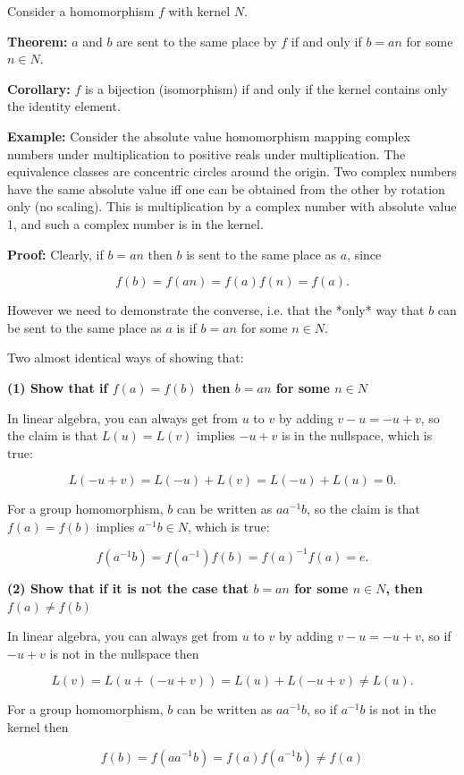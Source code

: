 Consider a homomorphism $f$ with kernel $N$.

\textbf{Theorem:} $a$ and $b$ are sent to the same place by $f$ if and only if
$b = an$ for some $n \in N$.

\textbf{Corollary:} $f$ is a bijection (isomorphism) if and only if the kernel
contains only the identity element.

\textbf{Example:} Consider the absolute value homomorphism mapping complex numbers
under multiplication to positive reals under multiplication. The equivalence
classes are concentric circles around the origin. Two complex numbers have the
same absolute value iff one can be obtained from the other by rotation only (no
scaling). This is multiplication by a complex number with absolute value 1, and
such a complex number is in the kernel.

\textbf{Proof:} Clearly, if $b = an$ then $b$ is sent to the same place as $a$,
since

$$
f(b) = f(an) = f(a)f(n) = f(a).
$$

However we need to demonstrate the converse, i.e. that the *only* way that $b$
can be sent to the same place as $a$ is if $b=an$ for some $n \in N$.

Two almost identical ways of showing that:

\textbf{(1) Show that if $f(a) = f(b)$ then $b = an$ for some $n \in N$}

In linear algebra, you can always get from $u$ to $v$ by adding $v - u = -u +
v$, so the claim is that $L(u) = L(v)$ implies $-u + v$ is in the nullspace,
which is true:

$$
L(-u + v) = L(-u) + L(v) = L(-u) + L(u) = 0.
$$

For a group homomorphism, $b$ can be written as $aa^{-1}b$, so the claim is
that $f(a) = f(b)$ implies $a^{-1}b \in N$, which is true:

$$
f(a^{-1}b) = f(a^{-1})f(b) = f(a)^{-1}f(a) = e.
$$

\textbf{(2) Show that if it is not the case that $b = an$ for some $n \in N$, then $f(a) \neq f(b)$}

In linear algebra, you can always get from $u$ to $v$ by adding $v - u = -u + v$,
so if $-u + v$ is not in the nullspace then

$$
L(v) = L(u + (-u + v)) = L(u) + L(-u + v) \neq L(u).
$$

For a group homomorphism, $b$ can be written as $aa^{-1}b$, so if $a^{-1}b$ is
not in the kernel then

$$
f(b) = f(aa^{-1}b) = f(a)f(a^{-1}b) \neq f(a)
$$


